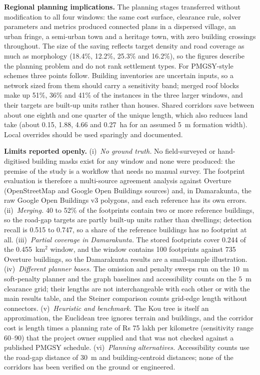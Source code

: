 \documentclass[preprint,12pt]{elsarticle}
\begin{document}
\textbf{Regional planning implications.} The planning stages transferred without modification to all four windows: the same cost surface, clearance rule, solver parameters and metrics produced connected plans in a dispersed village, an urban fringe, a semi-urban town and a heritage town, with zero building crossings throughout. The size of the saving reflects target density and road coverage as much as morphology (18.4\%, 12.2\%, 25.3\% and 16.2\%), so the figures describe the planning problem and do not rank settlement types. For PMGSY-style schemes \cite{pmgsy,irc2002sp20} three points follow. Building inventories are uncertain inputs, so a network sized from them should carry a sensitivity band; merged roof blocks make up 51\%, 36\% and 41\% of the instances in the three larger windows, and their targets are built-up units rather than houses. Shared corridors save between about one eighth and one quarter of the unique length, which also reduces land take (about 0.15, 1.88, 4.66 and 0.27~ha for an assumed 5~m formation width). Local overrides should be used sparingly and documented.

\textbf{Limits reported openly.} (i)~\emph{No ground truth.} No field-surveyed or hand-digitised building masks exist for any window and none were produced: the premise of the study is a workflow that needs no manual survey. The footprint evaluation is therefore a multi-source agreement analysis against Overture (OpenStreetMap and Google Open Buildings sources) and, in Damarakunta, the raw Google Open Buildings v3 polygons, and each reference has its own errors. (ii)~\emph{Merging.} 40 to 52\% of the footprints contain two or more reference buildings, so the road-gap targets are partly built-up units rather than dwellings; detection recall is 0.515 to 0.747, so a share of the reference buildings has no footprint at all. (iii)~\emph{Partial coverage in Damarakunta.} The stored footprints cover 0.244 of the 0.455~km$^2$ window, and the window contains 100 footprints against 735 Overture buildings, so the Damarakunta results are a small-sample illustration. (iv)~\emph{Different planner bases.} The omission and penalty sweeps run on the $10$~m soft-penalty planner and the graph baselines and accessibility counts on the $5$~m clearance grid; their lengths are not interchangeable with each other or with the main results table, and the Steiner comparison counts grid-edge length without connectors. (v)~\emph{Heuristic and benchmark.} The Kou tree is itself an approximation, the Euclidean tree ignores terrain and buildings, and the corridor cost is length times a planning rate of Rs 75 lakh per kilometre (sensitivity range 60--90) that the project owner supplied and that was not checked against a published PMGSY schedule. (vi)~\emph{Planning alternatives.} Accessibility counts use the road-gap distance of 30~m and building-centroid distances; none of the corridors has been verified on the ground or engineered.
\end{document}
